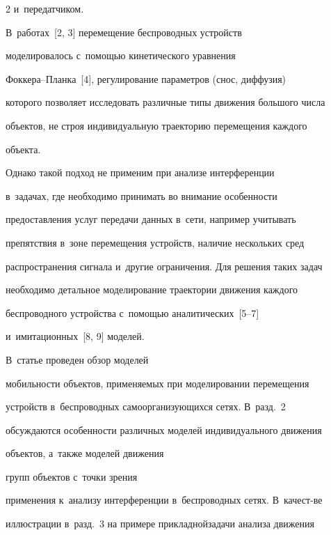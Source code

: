 \begin{multicols}{2}
и~передатчиком. 



В~работах~[2, 3] перемещение беспроводных устройств 

моделировалось с~по\-мощью ки\-не\-ти\-ческого уравнения  

Фок\-ке\-ра--Планка~[4], регулирование па\-ра\-мет\-ров (снос, диффузия) 

которого позволяет исследовать различные типы движения большого чис\-ла 

объектов, не строя индивидуальную траекторию перемещения каждого 

объекта. 



Однако такой подход не применим при анализе интерференции 

в~задачах, где необходимо принимать во внимание особенности 

предоставления услуг передачи данных в~сети, например учитывать 

препятствия в~зоне перемещения устройств, наличие нескольких сред 

распространения сигнала и~другие ограничения. Для решения таких задач 

необходимо детальное моделирование траектории движения каждого 

беспроводного устройства с~по\-мощью аналитических~[5--7] 

и~имитационных~[8, 9] моделей. 









В~статье проведен обзор моделей 

мо\-биль\-ности объектов, применяемых при моделировании перемещения 

устройств в~беспроводных самоорганизующихся сетях. В~разд.~2 

об\-суж\-да\-ют\-ся особенности различных моделей индивидуального движения 

объектов, а~также моделей движения\linebreak

 групп объектов с~точки зрения 

применения к~анализу интерференции в~беспроводных сетях. В~качест-\linebreak ве 

иллюстрации в~разд.~3 на примере прикладной\linebreak задачи анализа движения 


\end{multicols}
